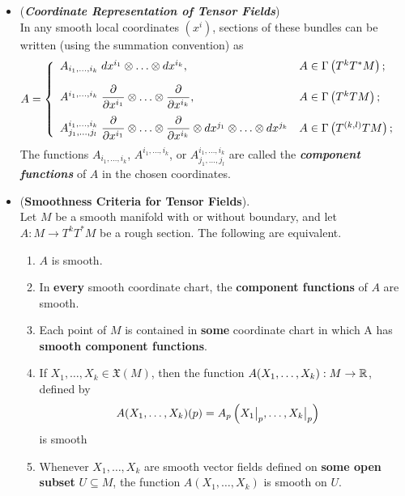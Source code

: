 \documentclass[11pt]{article}
\begin{document}
\begin{itemize}
\item \begin{remark} (\emph{\textbf{Coordinate Representation of Tensor Fields}})\\
In any smooth local coordinates $(x^i)$, sections of these bundles can be written (using the summation convention) as
\begin{align}
A &= \left\{
\begin{array}{ll}
A_{i_1,\ldots,i_k}\;dx^{i_1}\otimes \ldots \otimes dx^{i_k},                                        & A \in \Gamma\left(T^kT^{*}M\right);\\[10pt]
A^{i_1,\ldots,i_k}\;\dfrac{\partial}{\partial x^{i_1}} \otimes \ldots \otimes \dfrac{\partial}{\partial x^{i_k}}, & A \in \Gamma\left(T^kTM\right);\\[10pt]
A^{i_1,\ldots,i_k}_{j_1,\ldots,j_l}\;\dfrac{\partial}{\partial x^{i_1}} \otimes \ldots \otimes \dfrac{\partial}{\partial x^{i_k}} \otimes dx^{j_1}\otimes \ldots \otimes dx^{j_k} 
&  A \in \Gamma\left(T^{(k,l)}TM\right);
\end{array}
 \right.\label{eqn: coordinate_tensor_fields}
\end{align} The functions $A_{i_1,\ldots,i_k}$, $A^{i_1,\ldots,i_k}$, or $A^{i_1,\ldots,i_k}_{j_1,\ldots,j_l}$ are called the \emph{\textbf{component functions}} of $A$
in the chosen coordinates. 
\end{remark}

\item \begin{proposition} (\textbf{Smoothness Criteria for Tensor Fields}).\\
Let $M$ be a smooth manifold with or without boundary, and let $A: M \rightarrow T^kT^{*}M$ be a rough section. The following are equivalent.
\begin{enumerate}
\item $A$ is smooth.
\item In \textbf{every} smooth coordinate chart, the \textbf{component functions} of $A$ are smooth.
\item Each point of $M$ is contained in \textbf{some} coordinate chart in which A has \textbf{smooth component functions}.
\item If $X_1,\ldots,X_k \in \mathfrak{X}(M)$, then the function $A(X_1,\ldots,X_k): M \rightarrow {\mathbb R}$, defined by
\begin{align}
A(X_1,\ldots,X_k)(p) &= A_{p}\left(X_1\bigr|_{p},\ldots,X_k\bigr|_{p}\right) \label{eqn: covariant_tensor_field_induce_smooth_function}
\end{align} is smooth
\item Whenever $X_1,\ldots,X_k$ are smooth vector fields defined on \textbf{some open subset} $U\subseteq M$, the function $A(X_1,\ldots,X_k)$ is smooth on $U$.
\end{enumerate}
\end{proposition}


\end{itemize}
\end{document}
